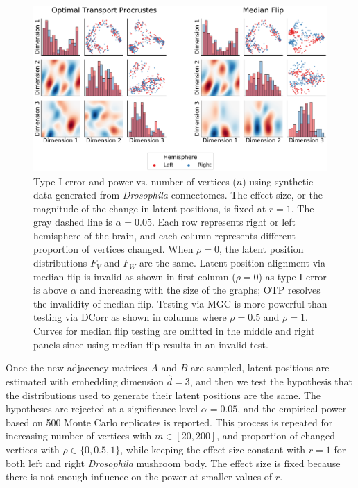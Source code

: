 \begin{figure}[b!]
    \centering
    \includegraphics[width=1\linewidth]{figures/nonpar/figure3.pdf}
    \caption[Type I error and power vs. number of vertices ($n$) using synthetic data generated from \textit{Drosophila} connectomes.]
    {Type I error and power vs. number of vertices ($n$) using synthetic data generated from \textit{Drosophila} connectomes. The effect size, or the magnitude of the change in latent positions, is fixed at $r = 1$. The gray dashed line is $\alpha=0.05$.
    Each row represents right or left hemisphere of the brain, and each column represents different proportion of vertices changed. When $\rho = 0$, the latent position distributions $F_V$ and $F_W$ are the same. Latent position alignment via median flip is invalid as shown in first column ($\rho = 0$) as type I error is above $\alpha$ and increasing with the size of the graphs; OTP resolves the invalidity of median flip. 
    Testing via MGC is more powerful than testing via DCorr as shown in columns where $\rho = 0.5$ and $\rho = 1$.
    Curves for median flip testing are omitted in the middle and right panels since using median flip results in an invalid test. 
    }
    \label{fig:synthetic_power}
\end{figure}

Once the new adjacency matrices $A$ and $B$ are sampled, latent positions are estimated with embedding dimension $\hat{d} = 3$, and then we test the hypothesis that the distributions used to generate their latent positions are the same. %
The hypotheses are rejected at a significance level $\alpha=0.05$, and the empirical power based on 500 Monte Carlo replicates is reported. This process is repeated for increasing number of vertices with $m\in[20, 200]$, and proportion of changed vertices with $\rho \in \{0, 0.5, 1\}$, while keeping the effect size constant with $r = 1$ for both left and right \textit{Drosophila} mushroom body. The effect size is fixed because there is not enough influence on the power at smaller values of $r$.

